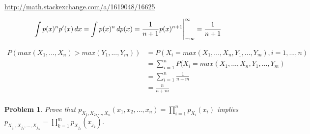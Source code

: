 \documentclass{book}
\newtheorem{problem}{Problem}
\begin{document}
\url{http://math.stackexchange.com/a/1619048/16625}

$$\int p(x)^n p'(x) \,dx =  \int p(x)^n\,dp(x) = \frac{1}{n+1}p(x)^{n+1}\Bigg{|}_{-\infty}^{\infty}=\frac{1}{n+1}$$

\begin{align*}
  P(max(X_1, ..., X_n) > max(Y_1, ..., Y_m)) &= P(X_i = max(X_1, ..., X_n, Y_1,
  ..., Y_m), i=1,...,n) \\
  &= \sum_{i=1}^n P(X_i = max(X_1, ..., X_n, Y_1, ..., Y_m) \\
  &= \sum_{i=1}^n \frac{1}{n+m} \\
  &= \frac{n}{n+m} \\
\end{align*}

\begin{problem}
  Prove that $p_{X_1,X_2,...,X_n}(x_1,x_2,...,x_n) = \prod_{i=1}^{n}p_{X_i}(x_i)$ implies $p_{X_{j_{1}},
X_{j_{2}},...,X_{j_{m}}} = \prod_{k=1}^{m}p_{X_{j_{k}}}(x_{j_{k}})$.
\end{problem}
\end{document}
